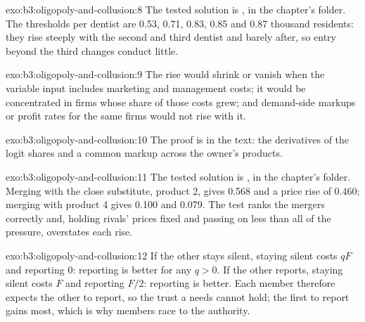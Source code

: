 \begin{solution}{exo:b3:oligopoly-and-collusion:8}
The tested solution is , in the chapter's 
folder. The thresholds per dentist are 0.53, 0.71, 0.83, 0.85 and 0.87 thousand residents: they
rise steeply with the second and third dentist and barely after, so entry beyond the
third changes conduct little. %
\end{solution}

\begin{solution}{exo:b3:oligopoly-and-collusion:9}
The rise would shrink or vanish when the variable input includes marketing and
management costs; it would be concentrated in firms whose share of those costs grew;
and demand-side markups or profit rates for the same firms would not rise with it.
\end{solution}

\begin{solution}{exo:b3:oligopoly-and-collusion:10}
The proof is in the text: the derivatives of the logit shares and a common markup
across the owner's products.
\end{solution}

\begin{solution}{exo:b3:oligopoly-and-collusion:11}
The tested solution is , in the chapter's 
folder. Merging with the close substitute, product 2, gives  0.568 and
a price rise of 0.460; merging with product 4 gives 0.100 and 0.079. The test ranks the mergers
correctly and, holding rivals' prices fixed and passing on less than all of the
pressure, overstates each rise. %
\end{solution}

\begin{solution}{exo:b3:oligopoly-and-collusion:12}
If the other stays silent, staying silent costs $qF$ and reporting 0: reporting is better
for any $q > 0$. If the other reports, staying silent costs $F$ and reporting $F/2$: reporting is better.
Each member therefore expects the other to report, so the trust a  needs
cannot hold; the first to report gains most, which is why members race to the
authority.
\end{solution}

